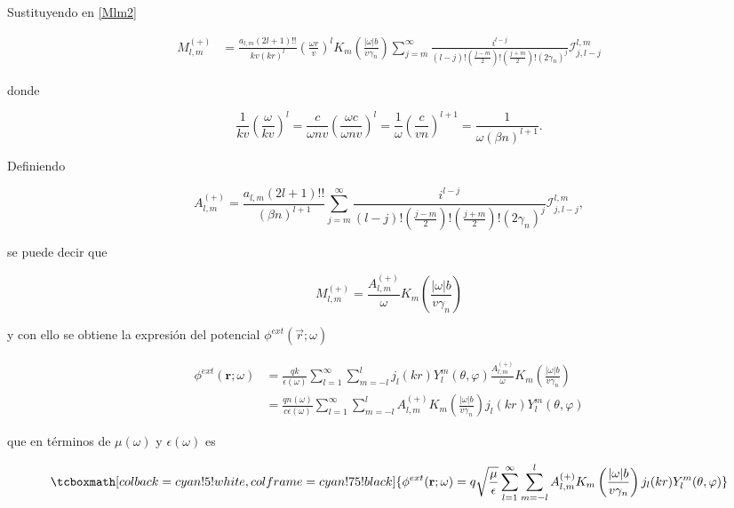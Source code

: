 \documentclass[a4paper,10pt]{article}
\begin{document}
Sustituyendo en \eqref{Mlm2}

\begin{equation}
\begin{aligned}
M_{l,m}^{(+)}
	&=\frac{a_{l,m}(2l+1)!!}{kv (kr)^l}\left(\frac{\omega r}{v}\right)^{l}K_m\left( \frac{|\omega|b}{v\gamma_n} \right) \sum_{j=m}^{\infty}\frac{i^{l-j}}{(l-j)!\left(\frac{j-m}{2}\right)!\left(\frac{j+m}{2}\right)!(2\gamma_n)^{j}}\mathcal{I}_{j,l-j}^{l,m}
\end{aligned}
\label{Mlm3}
\end{equation}

donde

\begin{equation}
\frac{1}{kv}\left(\frac{\omega}{kv} \right)^l=\frac{c}{\omega nv} \left(\frac{\omega c}{\omega nv} \right)^l=\frac{1}{\omega} \left(\frac{c}{vn}\right)^{l+1}=\frac{1}{\omega(\beta n)^{l+1}}.
\end{equation}

Definiendo

\begin{equation}
A_{l,m}^{(+)}=\frac{a_{l,m}(2l+1)!!}{(\beta n)^{l+1}}\sum_{j=m}^{\infty}\frac{i^{l-j}}{(l-j)!\left(\frac{j-m}{2}\right)!\left(\frac{j+m}{2}\right)!(2\gamma_n)^{j}}\mathcal{I}_{j,l-j}^{l,m},
\end{equation}

se puede decir que

\begin{equation}
M_{l,m}^{(+)}=\frac{A_{l,m}^{(+)}}{\omega}K_m\left( \frac{|\omega|b}{v\gamma_n} \right)
\end{equation}

y con ello se obtiene la expresión del potencial $\phi^{ext}(\vec{r};\omega)$

\begin{equation}
\begin{aligned}
\phi^{ext}(\textbf{r};\omega)
	&=\frac{qk}{\epsilon(\omega)}\sum_{l=1}^{\infty}\sum_{m=-l}^l j_l(kr)Y_l^m(\theta,\varphi)\frac{A_{l,m}^{(+)}}{\omega}K_m\left( \frac{|\omega|b}{v\gamma_n} \right)	\\
	&=\frac{qn(\omega)}{c\epsilon(\omega)}\sum_{l=1}^{\infty}\sum_{m=-l}^l A_{l,m}^{(+)}K_m\left( \frac{|\omega|b}{v\gamma_n} \right) j_l(kr)Y_l^m(\theta,\varphi)
\end{aligned}
\end{equation}

que en términos de $\mu(\omega)$ y $\epsilon(\omega)$ es

\begin{equation}
\tcboxmath[colback=cyan!5!white,colframe=cyan!75!black]{
\phi^{ext}(\textbf{r};\omega)=q\sqrt{\frac{\mu}{\epsilon}}\sum_{l=1}^{\infty}\sum_{m=-l}^l A_{l,m}^{(+)}K_m\left( \frac{|\omega|b}{v\gamma_n} \right) j_l(kr)Y_l^m(\theta,\varphi)}
\label{PotencialExtPolar}
\end{equation}
\end{document}

